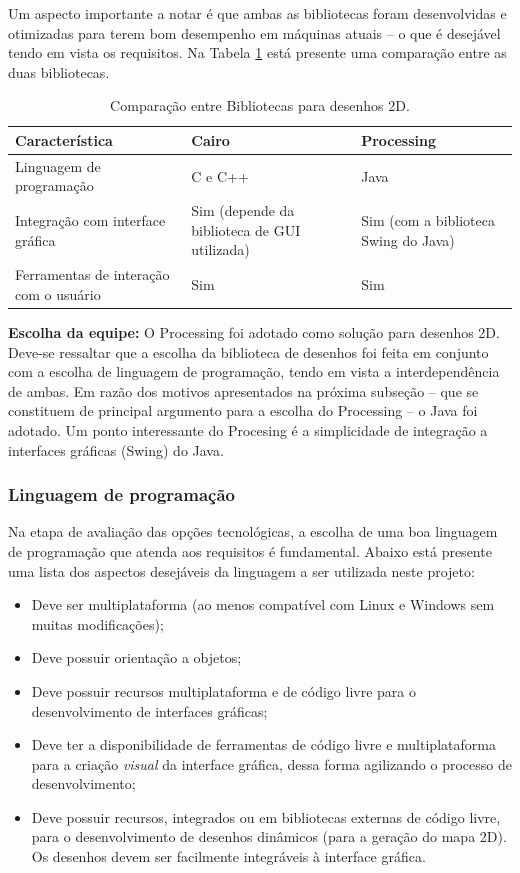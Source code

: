 Um aspecto importante a notar é que ambas as bibliotecas foram desenvolvidas e otimizadas para terem bom desempenho em máquinas atuais -- o que é desejável tendo em vista os requisitos. Na Tabela \ref{tab:alternativas_desenho} está presente uma comparação entre as duas bibliotecas.


\begin{table}[h]
  \caption{Comparação entre Bibliotecas para desenhos 2D.}
  \centering
  \begin{tabular}{p{6cm}|p{4cm}p{4cm}}
    \toprule
    \textbf{Característica} & \textbf{Cairo} & \textbf{Processing} \\
    \midrule
    Linguagem de programação & C e C++ & Java \\
    \hline
    Integração com interface gráfica & Sim (depende da biblioteca de GUI utilizada) & Sim (com a biblioteca Swing do Java) \\
    \hline
    Ferramentas de interação com o usuário & Sim & Sim \\
    \bottomrule
  \end{tabular}
  \label{tab:alternativas_desenho}
\end{table}

\textbf{Escolha da equipe:} O Processing foi adotado como solução para desenhos 2D. Deve-se ressaltar que a escolha da biblioteca de desenhos foi feita em conjunto com a escolha de linguagem de programação, tendo em vista a interdependência de ambas. Em razão dos motivos apresentados na próxima subseção -- que se constituem de principal argumento para a escolha do Processing -- o Java foi adotado. Um ponto interessante do Procesing é a simplicidade de integração a interfaces gráficas (Swing) do Java.

\subsubsection{Linguagem de programação}

Na etapa de avaliação das opções tecnológicas, a escolha de uma boa linguagem de programação que atenda aos requisitos é fundamental. Abaixo está presente uma lista dos aspectos desejáveis da linguagem a ser utilizada neste projeto:

\begin{itemize}
  \item Deve ser multiplataforma (ao menos compatível com Linux e Windows sem muitas modificações);
  \item Deve possuir orientação a objetos;
  \item Deve possuir recursos multiplataforma e de código livre para o desenvolvimento de interfaces gráficas;
  \item Deve ter a disponibilidade de ferramentas de código livre e multiplataforma para a criação \textit{visual} da interface gráfica, dessa forma agilizando o processo de desenvolvimento;
  \item Deve possuir recursos, integrados ou em bibliotecas externas de código livre, para o desenvolvimento de desenhos dinâmicos (para a geração do mapa 2D). Os desenhos devem ser facilmente integráveis à interface gráfica.
\end{itemize}


